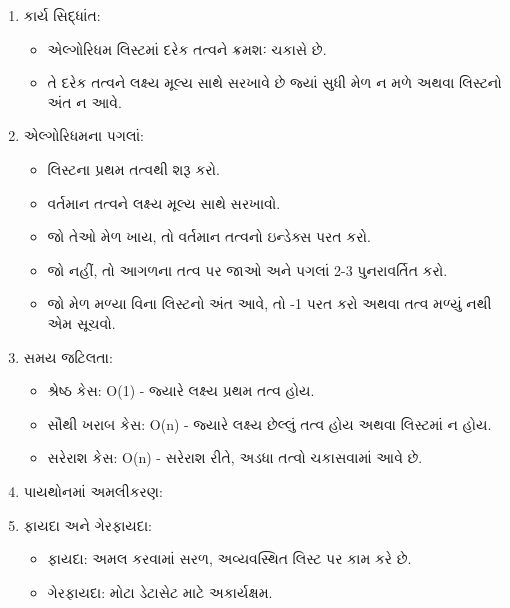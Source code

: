 \begin{enumerate}
\def\labelenumi{\arabic{enumi}.}
\item
  કાર્ય સિદ્ધાંત:

  \begin{itemize}
  \tightlist
  \item
    એલ્ગોરિધમ લિસ્ટમાં દરેક તત્વને ક્રમશઃ ચકાસે છે.
  \item
    તે દરેક તત્વને લક્ષ્ય મૂલ્ય સાથે સરખાવે છે જ્યાં સુધી મેળ ન મળે અથવા લિસ્ટનો અંત ન આવે.
  \end{itemize}
\item
  એલ્ગોરિધમના પગલાં:

  \begin{itemize}
  \tightlist
  \item
    લિસ્ટના પ્રથમ તત્વથી શરૂ કરો.
  \item
    વર્તમાન તત્વને લક્ષ્ય મૂલ્ય સાથે સરખાવો.
  \item
    જો તેઓ મેળ ખાય, તો વર્તમાન તત્વનો ઇન્ડેક્સ પરત કરો.
  \item
    જો નહીં, તો આગળના તત્વ પર જાઓ અને પગલાં 2-3 પુનરાવર્તિત કરો.
  \item
    જો મેળ મળ્યા વિના લિસ્ટનો અંત આવે, તો -1 પરત કરો અથવા તત્વ મળ્યું નથી એમ
    સૂચવો.
  \end{itemize}
\item
  સમય જટિલતા:

  \begin{itemize}
  \tightlist
  \item
    શ્રેષ્ઠ કેસ: O(1) - જ્યારે લક્ષ્ય પ્રથમ તત્વ હોય.
  \item
    સૌથી ખરાબ કેસ: O(n) - જ્યારે લક્ષ્ય છેલ્લું તત્વ હોય અથવા લિસ્ટમાં ન હોય.
  \item
    સરેરાશ કેસ: O(n) - સરેરાશ રીતે, અડધા તત્વો ચકાસવામાં આવે છે.
  \end{itemize}
\item
  પાયથોનમાં અમલીકરણ:

\begin{Shaded}
\begin{Highlighting}[]
     \NormalTok{(}
        \OperatorTok{==}
     \OperatorTok{{-}}
\end{Highlighting}
\end{Shaded}
\item
  ફાયદા અને ગેરફાયદા:

  \begin{itemize}
  \tightlist
  \item
    ફાયદા: અમલ કરવામાં સરળ, અવ્યવસ્થિત લિસ્ટ પર કામ કરે છે.
  \item
    ગેરફાયદા: મોટા ડેટાસેટ માટે અકાર્યક્ષમ.
  \end{itemize}
\end{enumerate}

